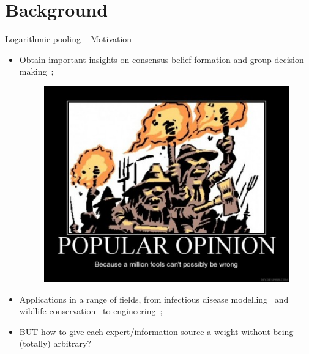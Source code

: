 \section*{Background}
\begin{frame}[t,plain]
\titlepage
\end{frame}
\begin{frame}{Logarithmic pooling -- Motivation}
 \begin{itemize}
  \item Obtain important insights on consensus belief formation and group decision making~\citep{genest1986B};
  \begin{figure}
 \begin{center}
  \includegraphics[scale=0.3]{figures/Consensus.jpg}
 \end{center}
  \end{figure}
  \item Applications in a range of fields, from infectious disease modelling~\citep{Coelho2009} and wildlife conservation~\citep{poole2000} to engineering~\citep{savchuk1994};
  \item[\tikzmark{bl}\textbullet] BUT how to give each expert/information source a weight without being (totally) arbitrary? 
 \end{itemize}
\end{frame}

